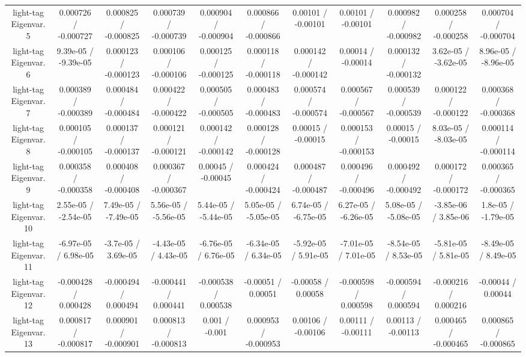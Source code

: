 \begin{table}[htbp]
\begin{center}
\begin{tabular}{|c|c|c|c|c|c|c|c|c|c|c|}
  light-tag Eigenvar. 5 & 0.000726 / -0.000727 & 0.000825 / -0.000825 & 0.000739 / -0.000739 & 0.000904 / -0.000904 & 0.000866 / -0.000866 & 0.00101 / -0.00101 & 0.00101 / -0.00101 & 0.000982 / -0.000982 & 0.000258 / -0.000258 & 0.000704 / -0.000704 \\ 
  light-tag Eigenvar. 6 & 9.39e-05 / -9.39e-05 & 0.000123 / -0.000123 & 0.000106 / -0.000106 & 0.000125 / -0.000125 & 0.000118 / -0.000118 & 0.000142 / -0.000142 & 0.00014 / -0.00014 & 0.000132 / -0.000132 & 3.62e-05 / -3.62e-05 & 8.96e-05 / -8.96e-05 \\ 
  light-tag Eigenvar. 7 & 0.000389 / -0.000389 & 0.000484 / -0.000484 & 0.000422 / -0.000422 & 0.000505 / -0.000505 & 0.000483 / -0.000483 & 0.000574 / -0.000574 & 0.000567 / -0.000567 & 0.000539 / -0.000539 & 0.000122 / -0.000122 & 0.000368 / -0.000368 \\ 
  light-tag Eigenvar. 8 & 0.000105 / -0.000105 & 0.000137 / -0.000137 & 0.000121 / -0.000121 & 0.000142 / -0.000142 & 0.000128 / -0.000128 & 0.00015 / -0.00015 & 0.000153 / -0.000153 & 0.00015 / -0.00015 & 8.03e-05 / -8.03e-05 & 0.000114 / -0.000114 \\ 
  light-tag Eigenvar. 9 & 0.000358 / -0.000358 & 0.000408 / -0.000408 & 0.000367 / -0.000367 & 0.00045 / -0.00045 & 0.000424 / -0.000424 & 0.000487 / -0.000487 & 0.000496 / -0.000496 & 0.000492 / -0.000492 & 0.000172 / -0.000172 & 0.000365 / -0.000365 \\ 
  light-tag Eigenvar. 10 & 2.55e-05 / -2.54e-05 & 7.49e-05 / -7.49e-05 & 5.56e-05 / -5.56e-05 & 5.44e-05 / -5.44e-05 & 5.05e-05 / -5.05e-05 & 6.74e-05 / -6.75e-05 & 6.27e-05 / -6.26e-05 & 5.08e-05 / -5.08e-05 & -3.85e-06 / 3.85e-06 & 1.8e-05 / -1.79e-05 \\ 
  light-tag Eigenvar. 11 & -6.97e-05 / 6.98e-05 & -3.7e-05 / 3.69e-05 & -4.43e-05 / 4.43e-05 & -6.76e-05 / 6.76e-05 & -6.34e-05 / 6.34e-05 & -5.92e-05 / 5.91e-05 & -7.01e-05 / 7.01e-05 & -8.54e-05 / 8.53e-05 & -5.81e-05 / 5.81e-05 & -8.49e-05 / 8.49e-05 \\ 
  light-tag Eigenvar. 12 & -0.000428 / 0.000428 & -0.000494 / 0.000494 & -0.000441 / 0.000441 & -0.000538 / 0.000538 & -0.00051 / 0.00051 & -0.00058 / 0.00058 & -0.000598 / 0.000598 & -0.000594 / 0.000594 & -0.000216 / 0.000216 & -0.00044 / 0.00044 \\ 
  light-tag Eigenvar. 13 & 0.000817 / -0.000817 & 0.000901 / -0.000901 & 0.000813 / -0.000813 & 0.001 / -0.001 & 0.000953 / -0.000953 & 0.00106 / -0.00106 & 0.00111 / -0.00111 & 0.00113 / -0.00113 & 0.000465 / -0.000465 & 0.000865 / -0.000865 \\ 

\end{tabular}
\end{center}
\end{table}
